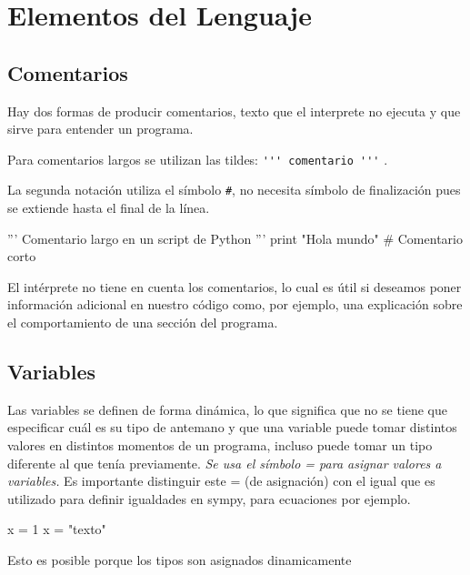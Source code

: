 \section{Elementos del Lenguaje}

\subsection{Comentarios}

Hay dos formas de producir comentarios, texto que el interprete  no ejecuta y que sirve para entender un programa.

Para comentarios largos se utilizan las tildes: \linebreak\verb~''' comentario '''~ .


 La segunda notación utiliza el símbolo \verb~#~, no necesita símbolo de finalización 
 pues se extiende hasta el final de la línea.

 \begin{pyverbatim}
'''
Comentario  largo en un script de Python
'''
print "Hola mundo" # Comentario corto
\end{pyverbatim}




El intérprete no tiene en cuenta los comentarios, lo cual es útil si deseamos poner información adicional en nuestro código como, por ejemplo, una explicación sobre el comportamiento de una sección del programa.








\subsection{Variables}
Las variables se definen de forma dinámica, lo que significa que no se tiene que especificar cuál es su tipo de antemano y que una variable puede tomar distintos valores en distintos momentos de un programa, incluso puede tomar
 un tipo diferente al que tenía previamente. \emph{Se usa el símbolo = para asignar valores a variables.}
 Es importante distinguir este = (de asignación) con el igual que es utilizado para definir igualdades en sympy, para ecuaciones por ejemplo.



\begin{pyverbatim}
x = 1
x = "texto" 
\end{pyverbatim}
Esto es posible porque los tipos son asignados
dinamicamente

